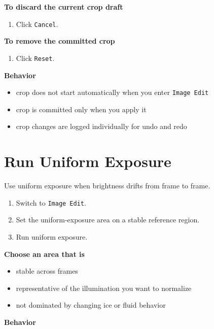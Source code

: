 \documentclass[
  9pt,
  letterpaper,
  oneside,
  open=any,
  DIV=15,
  parskip=half-,
  headings=big,
  numbers=noenddot
]{scrbook}
\newcommand{\manuallead}[1]{%
  \vspace{0.15em}%
  {\sffamily\bfseries\color{ManualBlue}#1}\par\nobreak\vspace{0.05em}%
}
\begin{document}
\manuallead{To discard the current crop draft}

\begin{enumerate}[leftmargin=*,itemsep=0.35em,topsep=0.4em]
\item Click \texttt{Cancel}.
\end{enumerate}

\manuallead{To remove the committed crop}

\begin{enumerate}[leftmargin=*,itemsep=0.35em,topsep=0.4em]
\item Click \texttt{Reset}.
\end{enumerate}

\manuallead{Behavior}

\begin{itemize}[leftmargin=*,itemsep=0.35em,topsep=0.4em]
\item crop does not start automatically when you enter \texttt{Image Edit}
\item crop is committed only when you apply it
\item crop changes are logged individually for undo and redo
\end{itemize}

\section{Run Uniform Exposure}

Use uniform exposure when brightness drifts from frame to frame.


\begin{enumerate}[leftmargin=*,itemsep=0.35em,topsep=0.4em]
\item Switch to \texttt{Image Edit}.
\item Set the uniform-exposure area on a stable reference region.
\item Run uniform exposure.
\end{enumerate}

\manuallead{Choose an area that is}

\begin{itemize}[leftmargin=*,itemsep=0.35em,topsep=0.4em]
\item stable across frames
\item representative of the illumination you want to normalize
\item not dominated by changing ice or fluid behavior
\end{itemize}

\manuallead{Behavior}
\end{document}
